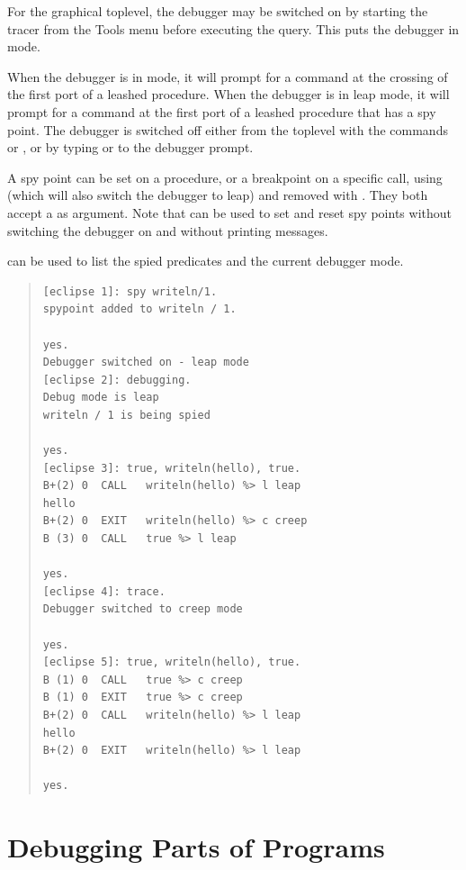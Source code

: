 For the \tkeclipse{} graphical toplevel, the debugger may be switched on by
starting the tracer from the Tools menu before executing the query. This
puts the debugger in  mode.

When the debugger is in  mode, it will
prompt for a command at the crossing of the first
port of a
leashed procedure.  When the debugger is in leap mode,
it will prompt for a command at the first port of a leashed
procedure that has a spy point.  The debugger is switched off either
from the toplevel with the commands
 or
, or by
typing  or  to the debugger prompt.

A spy point can be set on a procedure, or a breakpoint on a specific call,
using
 (which will
 also switch the debugger to leap)
and removed
with .  They
both accept a  as argument.  Note that
 can
be used to set and reset spy points without switching the debugger on
and without printing messages.

 can be
used to list the spied predicates and the current debugger mode.

\begin{quote}
\begin{verbatim}
[eclipse 1]: spy writeln/1.
spypoint added to writeln / 1.

yes.
Debugger switched on - leap mode
[eclipse 2]: debugging.
Debug mode is leap
writeln / 1 is being spied

yes.
[eclipse 3]: true, writeln(hello), true.
B+(2) 0  CALL   writeln(hello) %> l leap
hello
B+(2) 0  EXIT   writeln(hello) %> c creep
B (3) 0  CALL   true %> l leap

yes.
[eclipse 4]: trace.
Debugger switched to creep mode

yes.
[eclipse 5]: true, writeln(hello), true.
B (1) 0  CALL   true %> c creep
B (1) 0  EXIT   true %> c creep
B+(2) 0  CALL   writeln(hello) %> l leap
hello
B+(2) 0  EXIT   writeln(hello) %> l leap

yes.
\end{verbatim}
\end{quote}

\section{Debugging Parts of Programs}

